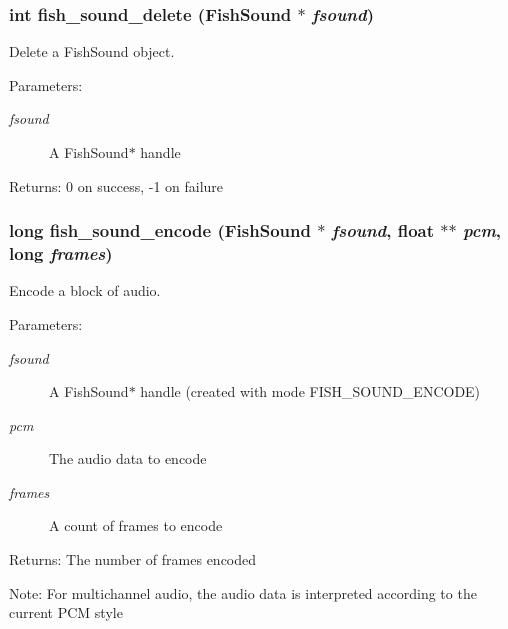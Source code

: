 \subsubsection{\setlength{\rightskip}{0pt plus 5cm}int fish\_\-sound\_\-delete ({\bf Fish\-Sound} $\ast$ {\em fsound})}\label{fishsound_8h_a10}


Delete a Fish\-Sound object. 

\begin{Desc}
\item[Parameters:]
\begin{description}
\item[{\em fsound}]A Fish\-Sound$\ast$ handle \end{description}
\end{Desc}
\begin{Desc}
\item[Returns:]0 on success, -1 on failure \end{Desc}
\subsubsection{\setlength{\rightskip}{0pt plus 5cm}long fish\_\-sound\_\-encode ({\bf Fish\-Sound} $\ast$ {\em fsound}, float $\ast$$\ast$ {\em pcm}, long {\em frames})}\label{fishsound_8h_a8}


Encode a block of audio. 

\begin{Desc}
\item[Parameters:]
\begin{description}
\item[{\em fsound}]A Fish\-Sound$\ast$ handle (created with mode FISH\_\-SOUND\_\-ENCODE) \item[{\em pcm}]The audio data to encode \item[{\em frames}]A count of frames to encode \end{description}
\end{Desc}
\begin{Desc}
\item[Returns:]The number of frames encoded \end{Desc}
\begin{Desc}
\item[Note:]For multichannel audio, the audio data is interpreted according to the current PCM style \end{Desc}
